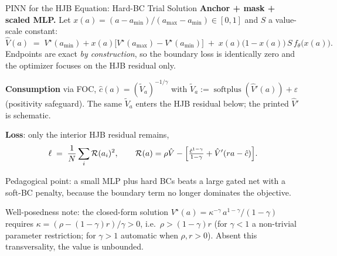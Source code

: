 \documentclass[aspectratio=169,11pt]{beamer}
\newcommand{\emphc}[1]{\textcolor{harvardcrimson}{#1}}
\begin{document}
\begin{frame}{PINN for the HJB Equation: Hard-BC Trial Solution}
\textbf{Anchor + mask + scaled MLP.}  Let $x(a) = (a-a_{\min})/(a_{\max}-a_{\min}) \in [0,1]$ and $S$ a value-scale constant:
\[
\hat V(a) \;=\; V^\star(a_{\min}) + x(a)\bigl[V^\star(a_{\max}) - V^\star(a_{\min})\bigr] \;+\; x(a)\bigl(1-x(a)\bigr)\,S\,f_\theta\bigl(x(a)\bigr).
\]
Endpoints are exact \emph{by construction}, so the boundary loss is identically zero and the optimizer focuses on the HJB residual only.

\vspace{0.3em}
\textbf{Consumption} via FOC, $\hat c(a) = (\widetilde V_a)^{-1/\gamma}$ with $\widetilde V_a := \operatorname{softplus}(\hat V'(a)) + \varepsilon$ (positivity safeguard).  The same $\widetilde V_a$ enters the HJB residual below; the printed $\hat V'$ is schematic.

\vspace{0.3em}
\textbf{Loss}: only the interior HJB residual remains,
\[
\ell \;=\; \frac{1}{N}\sum_{i}\mathcal{R}(a_i)^2,
\qquad
\mathcal{R}(a) = \rho\hat V - \Bigl[\tfrac{\hat c^{1-\gamma}}{1-\gamma} + \hat V'(ra - \hat c)\Bigr].
\]

\vspace{0.2em}
{\small \emphc{Pedagogical point:} a small MLP plus hard BCs beats a large gated net with a soft-BC penalty, because the boundary term no longer dominates the objective.}

\vspace{0.2em}
{\scriptsize \emphc{Well-posedness note:} the closed-form solution $V^\star(a) = \kappa^{-\gamma}\,a^{1-\gamma}/(1-\gamma)$ requires $\kappa = (\rho - (1-\gamma) r)/\gamma > 0$, i.e.\ $\rho > (1-\gamma) r$ (for $\gamma < 1$ a non-trivial parameter restriction; for $\gamma > 1$ automatic when $\rho, r > 0$). Absent this transversality, the value is unbounded.}
\end{frame}
\end{document}
